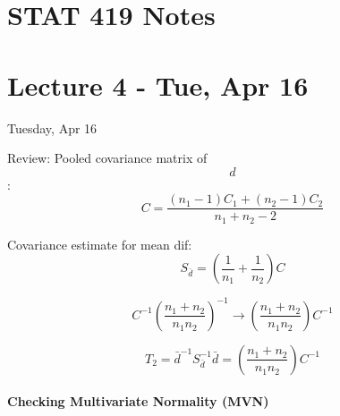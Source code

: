 \documentclass[]{article}
\date{}
\let\oldparagraph\paragraph
\renewcommand{\paragraph}[1]{\oldparagraph{#1}\mbox{}}
\begin{document}
\hypertarget{stat-419-notes}{%
\section{STAT 419 Notes}\label{stat-419-notes}}

\hypertarget{lecture-4---tue-apr-16}{%
\section{Lecture 4 - Tue, Apr 16}\label{lecture-4---tue-apr-16}}

Tuesday, Apr 16

Review: Pooled covariance matrix of \[d\]:
\[C = \frac{(n_1 - 1)C_1 + (n_2 - 1)C_2}{n_1 + n_2 - 2}\]

Covariance estimate for mean dif:
\[S_\bar{d} = (\frac{1}{n_1} + \frac{1}{n_2})C\]

\[C^{-1}(\frac{n_1 + n_2}{n_1n_2})^{-1} \to (\frac{n_1 + n_2}{n_1n_2})C^{-1}\]

\[T_2 = \bar{d}^{-1} S_\bar{d}^{-1}\bar{d} = (\frac{n_1 + n_2}{n_1n_2})C^{-1}\]

\hypertarget{checking-multivariate-normality-mvn}{%
\paragraph{Checking Multivariate Normality
(MVN)}\label{checking-multivariate-normality-mvn}}
\end{document}
